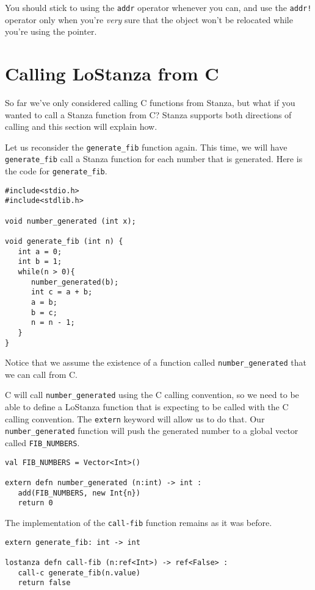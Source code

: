 \documentclass[10pt,oneside]{book}
\begin{document}
You should stick to using the \texttt{\frenchspacing addr} operator whenever you can, and use the \texttt{\frenchspacing addr!} operator only when you're {\em very} sure that the object won't be relocated while you're using the pointer.

\section{Calling LoStanza from C}
So far we've only considered calling C functions from Stanza, but what if you wanted to call a Stanza function from C? Stanza supports both directions of calling and this section will explain how.

Let us reconsider the \texttt{\frenchspacing generate\_fib} function again. This time, we will have \texttt{\frenchspacing generate\_fib} call a Stanza function for each number that is generated. Here is the code for \texttt{\frenchspacing generate\_fib}.
\begin{lstlisting}
#include<stdio.h>
#include<stdlib.h>

void number_generated (int x);

void generate_fib (int n) {
   int a = 0;
   int b = 1;
   while(n > 0){
      number_generated(b);
      int c = a + b;
      a = b;
      b = c;
      n = n - 1;
   }
}
\end{lstlisting}
Notice that we assume the existence of a function called \texttt{\frenchspacing number\_generated} that we can call from C.

C will call \texttt{\frenchspacing number\_generated} using the C calling convention, so we need to be able to define a LoStanza function that is expecting to be called with the C calling convention. The \texttt{\frenchspacing extern} keyword will allow us to do that. Our \texttt{\frenchspacing number\_generated} function will push the generated number to a global vector called \texttt{\frenchspacing FIB\_NUMBERS}.
\begin{lstlisting}
val FIB_NUMBERS = Vector<Int>()

extern defn number_generated (n:int) -> int :
   add(FIB_NUMBERS, new Int{n})
   return 0
\end{lstlisting}

The implementation of the \texttt{\frenchspacing call-fib} function remains as it was before.
\begin{lstlisting}
extern generate_fib: int -> int

lostanza defn call-fib (n:ref<Int>) -> ref<False> :
   call-c generate_fib(n.value)
   return false
\end{lstlisting}
\end{document}
